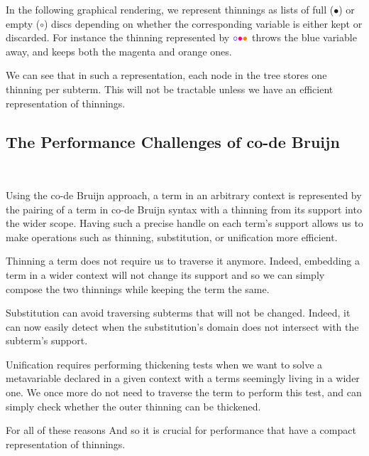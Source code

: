 In the following graphical rendering, we represent thinnings as lists of full
($\bullet$) or empty ($\circ$) discs depending on whether the corresponding
variable is either kept or discarded.
For instance the thinning represented by
$\color{blue}{\circ}\color{magenta}{\bullet}\color{orange}{\bullet}$
throws the {\color{blue}blue} variable away, and keeps both the
{\color{magenta}magenta} and {\color{orange}orange} ones.


We can see that in such a representation, each node in the tree stores one
thinning per subterm. This will not be tractable unless we have an efficient
representation of thinnings.

\subsection{The Performance Challenges of co-de Bruijn}~\label{sec:thinningsintypos}

Using the co-de Bruijn approach, a term in an arbitrary context is represented
by the pairing of a term in co-de Bruijn syntax with a thinning from its support
into the wider scope.
%
Having such a precise handle on each term's support allows us to make operations
such as thinning, substitution, or unification more efficient.

Thinning a term does not require us to traverse it anymore.
%
Indeed, embedding a term in a wider context will not change its support
and so we can simply compose the two thinnings while keeping the term the same.

Substitution can avoid traversing subterms that will not
be changed. Indeed, it can now easily detect when the substitution's domain
does not intersect with the subterm's support.

Unification requires performing thickening tests when we want to
solve a metavariable declared in a given context with a terms seemingly living
in a wider one. We once more do not need to traverse the term to perform this
test, and can simply check whether the outer thinning can be thickened.

For all of these reasons
\iftoggle{BLIND}
{the \typos~\cite{MANUAL:talk/types/Allais22} authors have, as we mentioned earlier,
opted for a co-de Bruijn representation.

}{
we have, as we mentioned earlier, opted for a co-de Bruijn
representation in the implementation of \typos~\cite{MANUAL:talk/types/Allais22}.
}
%
And so it is crucial for performance that
\iftoggle{BLIND}{they}{we} have a compact representation of thinnings.
%

